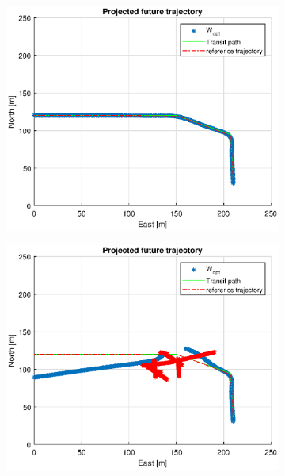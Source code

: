 \begin{figure} %
    \begin{subfigure}[b]{0.49\textwidth}
        \centering
        \includegraphics[width=\textwidth]{Images/Figures/Havn1/Simple0_f999_Frame1}
    \end{subfigure}
    \hfill
    \begin{subfigure}[b]{0.499\textwidth}
        \centering
        \includegraphics[width=\textwidth]{Images/Figures/Havn1/Simple0_f999_Frame2}

\end{subfigure}
\end{figure}

